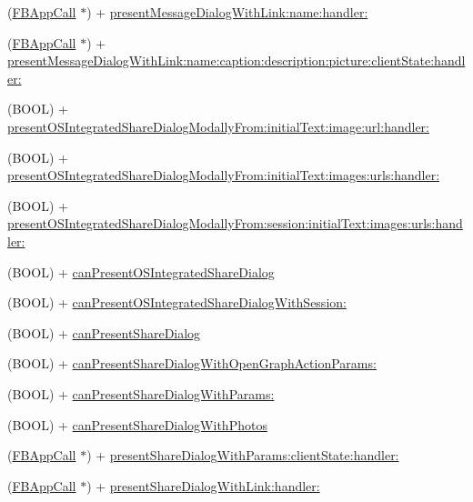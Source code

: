 \begin{DoxyCompactItemize}
\item 
(\hyperlink{interfaceFBAppCall}{F\+B\+App\+Call} $\ast$) + \hyperlink{interfaceFBDialogs_ab32ff5073473c59f8ced776e087d5fe4}{present\+Message\+Dialog\+With\+Link\+:name\+:handler\+:}
\item 
(\hyperlink{interfaceFBAppCall}{F\+B\+App\+Call} $\ast$) + \hyperlink{interfaceFBDialogs_a6441b5e4b196ed9b32180aa14400c05a}{present\+Message\+Dialog\+With\+Link\+:name\+:caption\+:description\+:picture\+:client\+State\+:handler\+:}
\item 
(B\+O\+OL) + \hyperlink{interfaceFBDialogs_a872dc61b3ce463fea47eec224f8fb635}{present\+O\+S\+Integrated\+Share\+Dialog\+Modally\+From\+:initial\+Text\+:image\+:url\+:handler\+:}
\item 
(B\+O\+OL) + \hyperlink{interfaceFBDialogs_ac4ebf0c4beb5669aadce04ae3b8d8b2b}{present\+O\+S\+Integrated\+Share\+Dialog\+Modally\+From\+:initial\+Text\+:images\+:urls\+:handler\+:}
\item 
(B\+O\+OL) + \hyperlink{interfaceFBDialogs_a923876e895060843c9ee0ce0836f1a7a}{present\+O\+S\+Integrated\+Share\+Dialog\+Modally\+From\+:session\+:initial\+Text\+:images\+:urls\+:handler\+:}
\item 
(B\+O\+OL) + \hyperlink{interfaceFBDialogs_a4239a93d5d1b150b93cf589bca6f46e1}{can\+Present\+O\+S\+Integrated\+Share\+Dialog}
\item 
(B\+O\+OL) + \hyperlink{interfaceFBDialogs_a268b4ee8ee491e006770a51cefa36eeb}{can\+Present\+O\+S\+Integrated\+Share\+Dialog\+With\+Session\+:}
\item 
(B\+O\+OL) + \hyperlink{interfaceFBDialogs_a017ecb9200d66140929cce227723a4d5}{can\+Present\+Share\+Dialog}
\item 
(B\+O\+OL) + \hyperlink{interfaceFBDialogs_ad8921a3906d28210cad0c0871e99f4bd}{can\+Present\+Share\+Dialog\+With\+Open\+Graph\+Action\+Params\+:}
\item 
(B\+O\+OL) + \hyperlink{interfaceFBDialogs_a36e9e390bb8c6040e6027b647ed587e8}{can\+Present\+Share\+Dialog\+With\+Params\+:}
\item 
(B\+O\+OL) + \hyperlink{interfaceFBDialogs_a16156d6a4664e4ea55e351bc78b6e8a7}{can\+Present\+Share\+Dialog\+With\+Photos}
\item 
(\hyperlink{interfaceFBAppCall}{F\+B\+App\+Call} $\ast$) + \hyperlink{interfaceFBDialogs_aea8f6d762fa50f312e7d574d27439349}{present\+Share\+Dialog\+With\+Params\+:client\+State\+:handler\+:}
\item 
(\hyperlink{interfaceFBAppCall}{F\+B\+App\+Call} $\ast$) + \hyperlink{interfaceFBDialogs_ad3172e31c558d23fd2546e482e6ad76a}{present\+Share\+Dialog\+With\+Link\+:handler\+:}

\end{DoxyCompactItemize}
